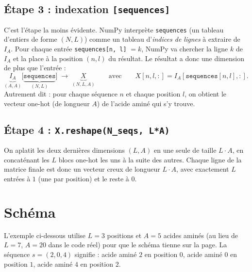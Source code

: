 \documentclass[11pt,a4paper]{article}
\begin{document}
\subsection*{Étape 3 : indexation \texttt{[sequences]}}
C'est l'étape la moins évidente. NumPy interprète \texttt{sequences} (un
tableau d'entiers de forme $(N, L)$) comme un tableau d'\emph{indices de
lignes} à extraire de $I_A$. Pour chaque entrée \texttt{sequences[n, l]} $= k$,
NumPy va chercher la ligne $k$ de $I_A$ et la place à la position $(n, l)$ du
résultat. Le résultat a donc une dimension de plus que l'entrée :
\[
    \underbrace{I_A}_{(A,A)}\big[\underbrace{\texttt{sequences}}_{(N,L)}\big]
    \;\longrightarrow\;
    \underbrace{X}_{(N, L, A)}
    \qquad\text{avec}\qquad
    X[n, l, :] = I_A[\texttt{sequences}[n,l], :].
\]
Autrement dit : pour chaque séquence $n$ et chaque position $l$, on obtient le
vecteur one-hot (de longueur $A$) de l'acide aminé qui s'y trouve.

\subsection*{Étape 4 : \texttt{X.reshape(N\_seqs, L*A)}}
On aplatit les deux dernières dimensions $(L, A)$ en une seule de taille
$L\cdot A$, en concaténant les $L$ blocs one-hot les uns à la suite des autres.
Chaque ligne de la matrice finale est donc un vecteur creux de longueur
$L\cdot A$, avec exactement $L$ entrées à $1$ (une par position) et le reste à
$0$.

\section{Schéma}

L'exemple ci-dessous utilise $L=3$ positions et $A=5$ acides aminés (au lieu de
$L=7$, $A=20$ dans le code réel) pour que le schéma tienne sur la page. La
séquence $s = (2, 0, 4)$ signifie : acide aminé $2$ en position $0$, acide
aminé $0$ en position $1$, acide aminé $4$ en position $2$.
\end{document}
